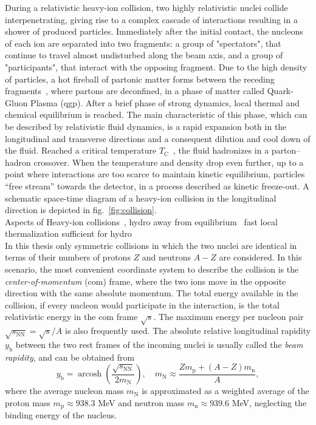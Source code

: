 \documentclass[a4paper,12pt]{book}
\begin{document}
During a relativistic heavy-ion collision, two highly relativistic nuclei collide interpenetrating, giving rise to a complex cascade of interactions resulting in a shower of produced particles. Immediately after the initial contact, the nucleons of each ion are separated into two fragments: a group of "spectators", that continue to travel almost undisturbed along the beam axis, and a group of "participants", that interact with the opposing fragment. Due to the high density of particles, a hot fireball of
partonic matter forms between the receding fragments~\parencite{Bjorken1983}, where partons are deconfined, in a phase of matter called Quark-Gluon Plasma (\acrshort{qgp}). After a brief phase of strong dynamics, local thermal and chemical equilibrium is reached. The main characteristic of this phase, which can be described by relativistic fluid dynamics, is a rapid expansion both in the longitudinal and transverse directions and a consequent dilution and cool down of the fluid. Reached a critical temperature $T_\text{C}$~\parencite{Hagedorn1965}, the fluid hadronizes in a parton–hadron crossover. When the temperature and density drop even further, up to a point where interactions are too scarce to maintain kinetic equilibrium, particles “free stream” towards the detector, in a process described as kinetic freeze-out. A schematic space-time diagram of a heavy-ion collision in the longitudinal direction is depicted in fig.~\ref{fig:collision}. \\



Aspects of Heavy-ion collisions~\parencite{Wolschin2020}, hydro away from equilibrium~\parencite{romatschke2017} fast local thermalization sufficient for hydro~\parencite{Heinz2013}\\

In this thesis only symmetric collisions in which the two nuclei are identical in terms of their numbers of protons $Z$ and neutrons $A-Z$ are considered. In this scenario, the most convenient coordinate system to describe the collision is the \textit{center-of-momentum} (\acrshort{com})  frame, where the two ions move in the opposite direction with the same absolute momentum. The total energy available in the collision, if every nucleon would participate in the interaction, is the total relativistic energy in the \acrshort{com} frame $\sqrt{s}$. The maximum energy per nucleon pair $\sqrt{s_{\text{NN}}} = \sqrt{s}/A$ is also frequently used. The absolute relative longitudinal rapidity $y_\text{b}$ between the two rest frames of the incoming nuclei is usually called the \textit{beam rapidity}, and can be obtained from
\begin{equation}
\label{eq:beam_rap}
    y_{\mathrm{b}}=\operatorname{arcosh}\left(\frac{\sqrt{s_{\mathrm{NN}}}}{2 m_{\mathrm{N}}}\right), \quad m_{\mathrm{N}} \approx \frac{Z m_{\mathrm{p}}+(A-Z) m_{\mathrm{n}}}{A},
\end{equation}
where the average nucleon mass $m_\text{N}$ is approximated as a weighted average of the proton
mass $m_{\mathrm{p}} \approx 938.3$ MeV and neutron mass $m_{\mathrm{n}} \approx 939.6$ MeV, neglecting the binding energy of the nucleus. 
\end{document}
